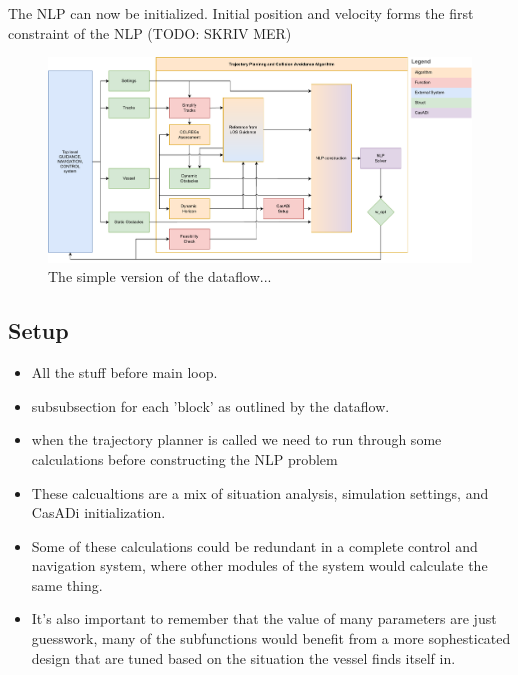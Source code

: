 The \gls{NLP} can now be initialized. Initial position and velocity forms the first constraint of the \gls{NLP} (TODO: SKRIV MER)




\begin{figure}
    \includegraphics[width=\textwidth]{Images/SimpleSystem.pdf}
    \caption{The simple version of the dataflow...}
    \label{FIG: Dataflow chart}
\end{figure}

\subsection{Setup}
\begin{itemize}
    \item All the stuff before main loop.
    \item subsubsection for each 'block' as outlined by the dataflow.
\end{itemize}

\begin{itemize}
    \item when the trajectory planner is called we need to run through some calculations before constructing the NLP problem
    \item These calcualtions are a mix of situation analysis, simulation settings, and CasADi initialization.
    \item Some of these calculations could be redundant in a complete control and navigation system,
    where other modules of the system would calculate the same thing.
    \item It's also important to remember that the value of many parameters are just guesswork, many of the subfunctions
    would benefit from a more sophesticated design that are tuned based on the situation the vessel finds itself in.
\end{itemize}

